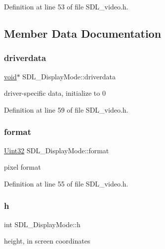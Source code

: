 Definition at line 53 of file S\+D\+L\+\_\+video.\+h.



\subsection{Member Data Documentation}
\mbox{\label{struct_s_d_l___display_mode_a411f93025411da873f37a384ae62bbcf}} 
\subsubsection{\texorpdfstring{driverdata}{driverdata}}
{\footnotesize\ttfamily \mbox{\hyperlink{_s_d_l__opengles2__gl2ext_8h_ae5d8fa23ad07c48bb609509eae494c95}{void}}$\ast$ S\+D\+L\+\_\+\+Display\+Mode\+::driverdata}

driver-\/specific data, initialize to 0 

Definition at line 59 of file S\+D\+L\+\_\+video.\+h.

\mbox{\label{struct_s_d_l___display_mode_ae8120e0a18a99992f039756e1b503680}} 
\subsubsection{\texorpdfstring{format}{format}}
{\footnotesize\ttfamily \mbox{\hyperlink{_s_d_l__stdinc_8h_add440eff171ea5f55cb00c4a9ab8672d}{Uint32}} S\+D\+L\+\_\+\+Display\+Mode\+::format}

pixel format 

Definition at line 55 of file S\+D\+L\+\_\+video.\+h.

\mbox{\label{struct_s_d_l___display_mode_a0d9eabed50a560ed553af772c26632d7}} 
\subsubsection{\texorpdfstring{h}{h}}
{\footnotesize\ttfamily int S\+D\+L\+\_\+\+Display\+Mode\+::h}

height, in screen coordinates 

